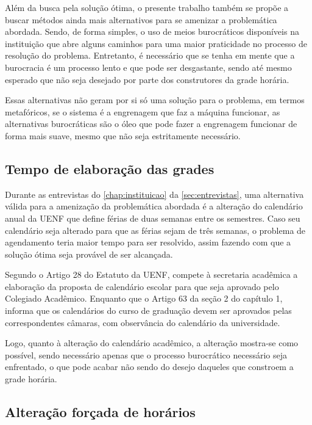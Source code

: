 Além da busca pela solução ótima, o presente trabalho também se propõe a buscar métodos ainda mais alternativos para se amenizar a problemática abordada. Sendo, de forma simples, o uso de meios burocráticos disponíveis na instituição que abre alguns caminhos para uma maior praticidade no processo de resolução do problema. Entretanto, é necessário que se tenha em mente que a burocracia é um processo lento e que pode ser desgastante, sendo até mesmo esperado que não seja desejado por parte dos construtores da grade horária.

Essas alternativas não geram por si só uma solução para o problema, em termos metafóricos, se o sistema é a engrenagem que faz a máquina funcionar, as alternativas burocráticas são o óleo que pode fazer a engrenagem funcionar de forma mais suave, mesmo que não seja estritamente necessário.

\subsection{Tempo de elaboração das grades} \label{subsec:burocracia-férias} %

Durante as entrevistas do \autoref{chap:instituicao} da \autoref{sec:entrevistas}, uma alternativa válida para a amenização da problemática abordada é a alteração do calendário anual da UENF que define férias de duas semanas entre os semestres. Caso seu calendário seja alterado para que as férias sejam de três semanas, o problema de agendamento teria maior tempo para ser resolvido, assim fazendo com que a solução ótima seja provável de ser alcançada.


Segundo o Artigo 28 do Estatuto da UENF, compete à secretaria acadêmica a elaboração da proposta de calendário escolar para que seja aprovado pelo Colegiado Acadêmico. Enquanto que o Artigo 63 da seção 2 do capítulo 1, informa que os calendários do curso de graduação devem ser aprovados pelas correspondentes câmaras, com observância do calendário da universidade.

Logo, quanto à alteração do calendário acadêmico, a alteração mostra-se como possível, sendo necessário apenas que o processo burocrático necessário seja enfrentado, o que pode acabar não sendo do desejo daqueles que constroem a grade horária.

\subsection{Alteração forçada de horários} \label{subsec:burocracia-troca} %

